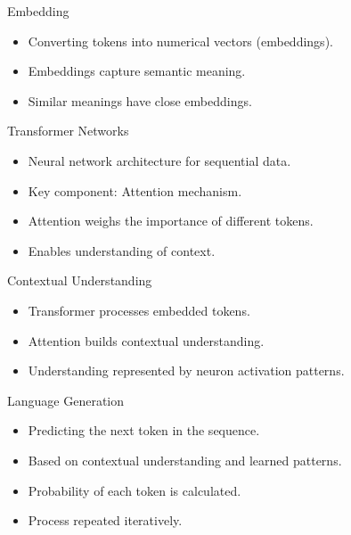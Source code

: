 \begin{frame}{Embedding}
  \begin{itemize}
    \item Converting tokens into numerical vectors (embeddings).
    \item Embeddings capture semantic meaning.
    \item Similar meanings have close embeddings.
  \end{itemize}
\end{frame}

\begin{frame}{Transformer Networks}
  \begin{itemize}
    \item Neural network architecture for sequential data.
    \item Key component: Attention mechanism.
    \item Attention weighs the importance of different tokens.
    \item Enables understanding of context.
  \end{itemize}
\end{frame}

\begin{frame}{Contextual Understanding}
  \begin{itemize}
    \item Transformer processes embedded tokens.
    \item Attention builds contextual understanding.
    \item Understanding represented by neuron activation patterns.
  \end{itemize}
\end{frame}

\begin{frame}{Language Generation}
  \begin{itemize}
    \item Predicting the next token in the sequence.
    \item Based on contextual understanding and learned patterns.
    \item Probability of each token is calculated.
    \item Process repeated iteratively.
  \end{itemize}
\end{frame}

